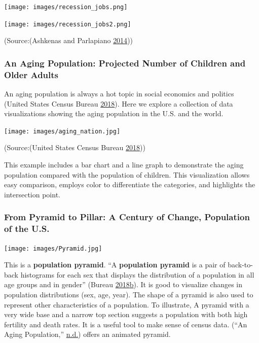 \documentclass[]{book}
\begin{document}
\texttt{[image: images/recession\_jobs.png]}

\texttt{[image: images/recession\_jobs2.png]}

(Source:(Ashkenas and Parlapiano \protect\hyperlink{ref-recession_economy}{2014}))

\hypertarget{an-aging-population-projected-number-of-children-and-older-adults}{%
\subsubsection{An Aging Population: Projected Number of Children and Older Adults}\label{an-aging-population-projected-number-of-children-and-older-adults}}

An aging population is always a hot topic in social economics and politics (United States Census Bureau \protect\hyperlink{ref-aging_nation}{2018}). Here we explore a collection of data visualizations showing the aging population in the U.S. and the world.

\texttt{[image: images/aging\_nation.jpg]}

(Source:(United States Census Bureau \protect\hyperlink{ref-aging_nation}{2018}))

This example includes a bar chart and a line graph to demonstrate the aging population compared with the population of children. This visualization allows easy comparison, employs color to differentiate the categories, and highlights the intersection point.

\hypertarget{from-pyramid-to-pillar-a-century-of-change-population-of-the-u.s.}{%
\subsubsection{From Pyramid to Pillar: A Century of Change, Population of the U.S.}\label{from-pyramid-to-pillar-a-century-of-change-population-of-the-u.s.}}

\texttt{[image: images/Pyramid.jpg]}

This is a \textbf{population pyramid}. ``A \textbf{population pyramid} is a pair of back-to-back histograms for each sex that displays the distribution of a population in all age groups and in gender'' (Bureau \protect\hyperlink{ref-population_pyramid}{2018}\protect\hyperlink{ref-population_pyramid}{b}). It is good to visualize changes in population distributions (sex, age, year). The shape of a pyramid is also used to represent other characteristics of a population. To illustrate, A pyramid with a very wide base and a narrow top section suggests a population with both high fertility and death rates. It is a useful tool to make sense of census data. (``An Aging Population,'' \protect\hyperlink{ref-animated_pyramid}{n.d.}) offers an animated pyramid.
\end{document}
